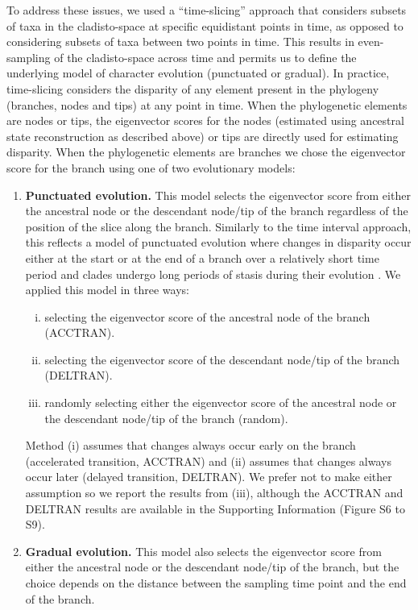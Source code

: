 \documentclass[12pt,letterpaper]{article}
\begin{document}
To address these issues, we used a ``time-slicing'' approach that considers subsets of taxa in the cladisto-space at specific equidistant points in time, as opposed to considering subsets of taxa between two points in time.
This results in even-sampling of the cladisto-space across time and permits us to define the underlying model of character evolution (punctuated or gradual).  
In practice, time-slicing considers the disparity of any element present in the phylogeny (branches, nodes and tips) at any point in time.
When the phylogenetic elements are nodes or tips, the eigenvector scores for the nodes (estimated using ancestral state reconstruction as described above) or tips are directly used for estimating disparity.
When the phylogenetic elements are branches we chose the eigenvector score for the branch using one of two evolutionary models:
\begin{enumerate}
    \item{\textbf{Punctuated evolution.}} 
    This model selects the eigenvector score from either the ancestral node or the descendant node/tip of the branch regardless of the position of the slice along the branch. 
    Similarly to the time interval approach, this reflects a model of punctuated evolution where changes in disparity occur either at the start or at the end of a branch over a relatively short time period and clades undergo long periods of stasis during their evolution \citep{Gould1977,Hunt20112007}.
    We applied this model in three ways: 
    \begin{enumerate}[(i)]
      \item selecting the eigenvector score of the ancestral node of the branch (ACCTRAN).
      \item selecting the eigenvector score of the descendant node/tip of the branch (DELTRAN).
      \item randomly selecting either the eigenvector score of the ancestral node or the descendant node/tip of the branch (random).
    \end{enumerate}
    Method (i) assumes that changes always occur early on the branch (accelerated transition, ACCTRAN) and (ii) assumes that changes always occur later (delayed transition, DELTRAN).
    We prefer not to make either assumption so we report the results from (iii), although the ACCTRAN and DELTRAN results are available in the Supporting Information (Figure S6 to S9).
    \item{\textbf{Gradual evolution.}}
    This model also selects the eigenvector score from either the ancestral node or the descendant node/tip of the branch, but the choice depends on the distance between the sampling time point and the end of the branch.

\end{enumerate}
\end{document}
